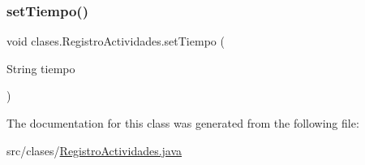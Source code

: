 \mbox{\label{classclases_1_1_registro_actividades_a6fbf13972bbe9cfc5c5b2601e280b615}} 
\subsubsection{\texorpdfstring{set\+Tiempo()}{setTiempo()}}
{\footnotesize\ttfamily void clases.\+Registro\+Actividades.\+set\+Tiempo (\begin{DoxyParamCaption}\item[{String}]{tiempo }\end{DoxyParamCaption})}



The documentation for this class was generated from the following file\+:\begin{DoxyCompactItemize}
\item 
src/clases/\mbox{\hyperlink{_registro_actividades_8java}{Registro\+Actividades.\+java}}\end{DoxyCompactItemize}
